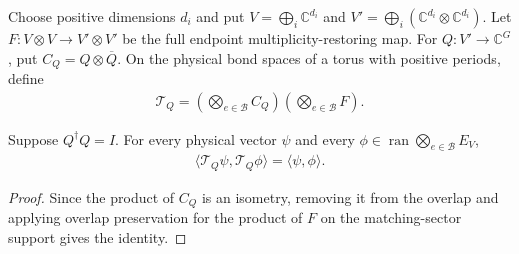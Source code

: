 \begin{definition}%
    \label{def:peps_torus_semiregular_bond_map}
    \leanok
    Choose positive dimensions $d_i$ and put
    $V=\bigoplus_i\mathbb C^{d_i}$ and
    $V'=\bigoplus_i(\mathbb C^{d_i}\otimes\mathbb C^{d_i})$.
    Let $F:V\otimes V\to V'\otimes V'$ be the full endpoint
    multiplicity-restoring map. For $Q:V'\to\mathbb C^G$, put
    $C_Q=Q\otimes\overline Q$. On the physical bond spaces of a torus
    with positive periods, define
    \begin{align}
        \mathcal T_Q=
        \left(\bigotimes_{e\in\mathcal B}C_Q\right)
        \left(\bigotimes_{e\in\mathcal B}F\right).
        \label{eq:peps_torus_semiregular_map}
    \end{align}
\end{definition}

\begin{lemma}%
    \label{thm:peps_torus_semiregular_supported_overlap}
    \leanok
    Suppose $Q^\dagger Q=I$. For every physical vector $\psi$ and every
    $\phi\in\operatorname{ran}\bigotimes_{e\in\mathcal B}E_V$,
    \begin{align}
        \langle\mathcal T_Q\psi,\mathcal T_Q\phi\rangle
        =\langle\psi,\phi\rangle.
    \end{align}
\end{lemma}
\begin{proof}\leanok
    Since the product of $C_Q$ is an isometry, removing it from the overlap
    and applying overlap preservation for the product of $F$ on the
    matching-sector support gives the identity.
\end{proof}

